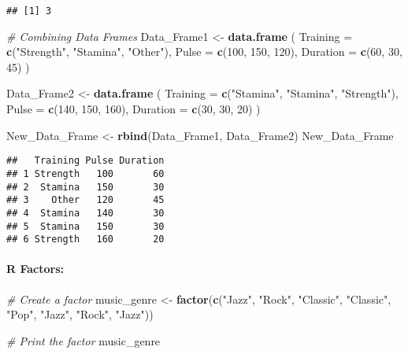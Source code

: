 \documentclass[
]{article}
\newenvironment{Shaded}{\begin{snugshade}}{\end{snugshade}}
\newcommand{\AttributeTok}[1]{\textcolor[rgb]{0.13,0.29,0.53}{#1}}
\newcommand{\CommentTok}[1]{\textcolor[rgb]{0.56,0.35,0.01}{\textit{#1}}}
\newcommand{\DecValTok}[1]{\textcolor[rgb]{0.00,0.00,0.81}{#1}}
\newcommand{\FunctionTok}[1]{\textcolor[rgb]{0.13,0.29,0.53}{\textbf{#1}}}
\newcommand{\NormalTok}[1]{#1}
\newcommand{\OtherTok}[1]{\textcolor[rgb]{0.56,0.35,0.01}{#1}}
\newcommand{\StringTok}[1]{\textcolor[rgb]{0.31,0.60,0.02}{#1}}
\begin{document}
\begin{verbatim}
## [1] 3
\end{verbatim}

\begin{Shaded}
\begin{Highlighting}[]
\CommentTok{\# Combining Data Frames}
\NormalTok{Data\_Frame1 }\OtherTok{\textless{}{-}} \FunctionTok{data.frame}\NormalTok{ (}
  \AttributeTok{Training =} \FunctionTok{c}\NormalTok{(}\StringTok{"Strength"}\NormalTok{, }\StringTok{"Stamina"}\NormalTok{, }\StringTok{"Other"}\NormalTok{),}
  \AttributeTok{Pulse =} \FunctionTok{c}\NormalTok{(}\DecValTok{100}\NormalTok{, }\DecValTok{150}\NormalTok{, }\DecValTok{120}\NormalTok{),}
  \AttributeTok{Duration =} \FunctionTok{c}\NormalTok{(}\DecValTok{60}\NormalTok{, }\DecValTok{30}\NormalTok{, }\DecValTok{45}\NormalTok{)}
\NormalTok{)}

\NormalTok{Data\_Frame2 }\OtherTok{\textless{}{-}} \FunctionTok{data.frame}\NormalTok{ (}
  \AttributeTok{Training =} \FunctionTok{c}\NormalTok{(}\StringTok{"Stamina"}\NormalTok{, }\StringTok{"Stamina"}\NormalTok{, }\StringTok{"Strength"}\NormalTok{),}
  \AttributeTok{Pulse =} \FunctionTok{c}\NormalTok{(}\DecValTok{140}\NormalTok{, }\DecValTok{150}\NormalTok{, }\DecValTok{160}\NormalTok{),}
  \AttributeTok{Duration =} \FunctionTok{c}\NormalTok{(}\DecValTok{30}\NormalTok{, }\DecValTok{30}\NormalTok{, }\DecValTok{20}\NormalTok{)}
\NormalTok{)}

\NormalTok{New\_Data\_Frame }\OtherTok{\textless{}{-}} \FunctionTok{rbind}\NormalTok{(Data\_Frame1, Data\_Frame2)}
\NormalTok{New\_Data\_Frame}
\end{Highlighting}
\end{Shaded}

\begin{verbatim}
##   Training Pulse Duration
## 1 Strength   100       60
## 2  Stamina   150       30
## 3    Other   120       45
## 4  Stamina   140       30
## 5  Stamina   150       30
## 6 Strength   160       20
\end{verbatim}

\hypertarget{r-factors}{%
\paragraph{R Factors:}\label{r-factors}}

\begin{Shaded}
\begin{Highlighting}[]
\CommentTok{\# Create a factor}
\NormalTok{music\_genre }\OtherTok{\textless{}{-}} \FunctionTok{factor}\NormalTok{(}\FunctionTok{c}\NormalTok{(}\StringTok{"Jazz"}\NormalTok{, }\StringTok{"Rock"}\NormalTok{, }\StringTok{"Classic"}\NormalTok{, }\StringTok{"Classic"}\NormalTok{, }\StringTok{"Pop"}\NormalTok{, }\StringTok{"Jazz"}\NormalTok{, }\StringTok{"Rock"}\NormalTok{, }\StringTok{"Jazz"}\NormalTok{))}

\CommentTok{\# Print the factor}
\NormalTok{music\_genre}
\end{Highlighting}
\end{Shaded}
\end{document}
